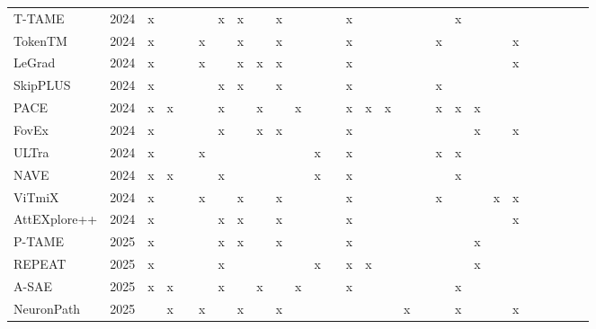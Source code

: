 \begin{tabular}{ll|cc|ccc|cc|cccc|ccccc|ccccc|ccccc}
T-TAME \cite{ntrougkasTTAMETrainableAttention2024} & 2024 & x &  &  &  & x & x &  & x &  &  &  & x &  &  &  &  &  & x &  &  &  &  &  &  &  &  \\
TokenTM \cite{wuTokenTransformationMatters2024} & 2024 & x &  &  & x &  & x &  & x &  &  &  & x &  &  &  &  & x &  &  &  & x &  &  &  &  &  \\
LeGrad \cite{bousselhamLeGradExplainabilityMethod2024} & 2024 & x &  &  & x &  & x & x & x &  &  &  & x &  &  &  &  &  &  &  &  & x &  &  &  &  &  \\
SkipPLUS \cite{mehriSkipPLUSSkipFirst2024} & 2024 & x &  &  &  & x & x &  & x &  &  &  & x &  &  &  &  & x &  &  &  &  &  &  &  &  &  \\
PACE \cite{wangProbabilisticConceptualExplainers2024} & 2024 & x & x &  &  & x &  & x &  & x &  &  & x & x & x &  &  & x & x & x &  &  &  &  &  &  &  \\
FovEx \cite{pandaHumaninspiredExplanationsVision2024} & 2024 & x &  &  &  & x &  & x & x &  &  &  & x &  &  &  &  &  &  & x &  & x &  &  &  &  &  \\
ULTra \cite{hosseiniULTraUnveilingLatent2024} & 2024 & x &  &  & x &  &  &  &  &  & x &  & x &  &  &  &  & x & x &  &  &  &  &  &  &  &  \\
NAVE \cite{boubekkiExplainingImpactTraining2024} & 2024 & x & x &  &  & x &  &  &  &  & x &  & x &  &  &  &  &  & x &  &  &  &  &  &  &  &  \\
ViTmiX \cite{hogeaViTmiXVisionTransformer2024} & 2024 & x &  &  & x &  & x &  & x &  &  &  & x &  &  &  &  & x &  &  & x & x &  &  &  &  &  \\
AttEXplore++ \cite{zhuAttributionEnhancedExplanation2024} & 2024 & x &  &  &  & x & x &  & x &  &  &  & x &  &  &  &  &  &  &  &  & x &  &  &  &  &  \\
\addlinespace
P-TAME \cite{ntrougkasPTAMEExplainAny2025} & 2025 & x &  &  &  & x & x &  & x &  &  &  & x &  &  &  &  &  &  & x &  &  &  &  &  &  &  \\
REPEAT \cite{wickstromREPEATImprovingUncertainty2024} & 2025 & x &  &  &  & x &  &  &  &  & x &  & x & x &  &  &  &  &  & x &  &  &  &  &  &  &  \\
A-SAE \cite{felArchetypalSAEAdaptive2025} & 2025 & x & x &  &  & x &  & x &  & x &  &  & x &  &  &  &  &  & x &  &  &  &  &  &  &  &  \\
NeuronPath \cite{wangDiscoveringInfluentialNeuron2025} & 2025 &  & x &  & x &  & x &  & x &  &  &  &  &  &  & x &  &  & x &  &  & x &  &  &  &  &  \\

\end{tabular}
